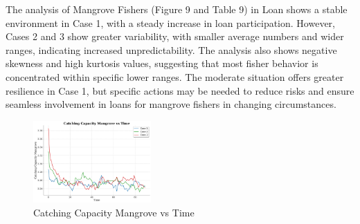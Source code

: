 \documentclass[final,5p,times,twocolumn,authoryear]{elsarticle}
\begin{document}
\begin{table}[htbp]
    \centering
    \caption{Mangrove Fishers in Loan - Statistical Analysis}
\end{table}
The analysis of Mangrove Fishers (Figure 9 and Table 9) in Loan shows a stable environment in Case 1, with a steady increase in loan participation. However, Cases 2 and 3 show greater variability, with smaller average numbers and wider ranges, indicating increased unpredictability. The analysis also shows negative skewness and high kurtosis values, suggesting that most fisher behavior is concentrated within specific lower ranges. The moderate situation offers greater resilience in Case 1, but specific actions may be needed to reduce risks and ensure seamless involvement in loans for mangrove fishers in changing circumstances.\\
\begin{figure}[htbp]
    \centering
    \includegraphics[width=0.4\textwidth]{graph_all/plots_mod/catching_capacity_mangrove_vs_time.png}
    \caption{Catching Capacity Mangrove vs Time}
    \label{fig:catching_mangrove}
\end{figure}
\end{document}
